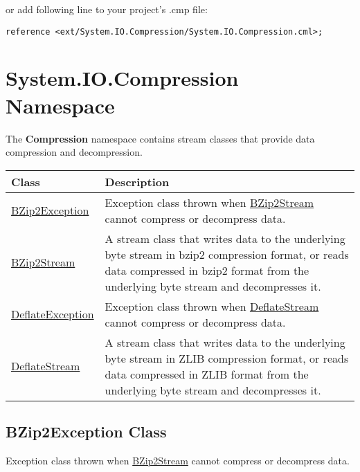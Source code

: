 \documentclass[a4paper,oneside,11.000000pt]{book}
\newcounter{subchapter}
\begin{document}
\begin{flushleft}
or add following line to your project's .cmp file:
\begin{verbatim}
reference <ext/System.IO.Compression/System.IO.Compression.cml>;
\end{verbatim}
\end{flushleft}
\hypertarget{System.IO.Compression}{\chapter{System.IO.Compression Namespace}}
\begin{flushleft}
The \textbf{Compression}
 namespace contains stream classes that provide data compression and decompression.

\end{flushleft}
\clearpage
{}
\begin{flushleft}
\begin{supertabular}[l]{!{\raggedright}p{3.97714cm}!{\raggedright}p{11.1729cm}}
\textbf{Class}
& \textbf{Description}
\\
\hline
\hyperlink{System.IO.Compression.BZip2Exception}{BZip2Exception}
& Exception class thrown when \hyperlink{System.IO.Compression.BZip2Stream}{BZip2Stream} cannot compress or decompress data.

\\
\hyperlink{System.IO.Compression.BZip2Stream}{BZip2Stream}
& A stream class that writes data to the underlying byte stream in bzip2 compression format, or reads data compressed in bzip2 format from the underlying byte stream and decompresses it.

\\
\hyperlink{System.IO.Compression.DeflateException}{DeflateException}
& Exception class thrown when \hyperlink{System.IO.Compression.DeflateStream}{DeflateStream} cannot compress or decompress data.

\\
\hyperlink{System.IO.Compression.DeflateStream}{DeflateStream}
& A stream class that writes data to the underlying byte stream in ZLIB compression format, or reads data compressed in ZLIB format from the underlying byte stream and decompresses it.

\\
\end{supertabular}

\end{flushleft}
\clearpage

\hypertarget{System.IO.Compression.BZip2Exception}{\section{BZip2Exception Class}}
\begin{flushleft}
Exception class thrown when \hyperlink{System.IO.Compression.BZip2Stream}{BZip2Stream} cannot compress or decompress data.

\end{flushleft}
\end{document}
